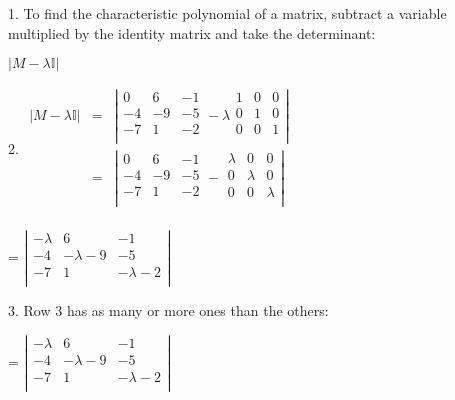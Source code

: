 \documentclass{article}
\begin{document}
1. To find the characteristic polynomial of a matrix, subtract a variable multiplied by the identity matrix and take the determinant:

$| M-\lambda  \mathbb{I}|$

2. $\begin{array}{lll}
| M-\lambda  \mathbb{I}| & = & \left|
      \begin{array}{ccc}
0  & 6  & -1 \\
        -4 & -9 & -5 \\
        -7 & 1  & -2 \\
      \end{array}
      -\lambda
      \begin{array}{ccc}
1 & 0 & 0 \\
        0 & 1 & 0 \\
        0 & 0 & 1 \\
      \end{array}
      \right|                               \\
\text{                        }& = & \left|
      \begin{array}{ccc}
0  & 6  & -1 \\
        -4 & -9 & -5 \\
        -7 & 1  & -2 \\
      \end{array}
      -
      \begin{array}{ccc}
\lambda & 0       & 0       \\
        0       & \lambda & 0       \\
        0       & 0       & \lambda \\
      \end{array}
      \right|                               \\
    \end{array}$

= $\left|
    \begin{array}{ccc}
-\lambda & 6           & -1          \\
      -4       & -\lambda -9 & -5          \\
      -7       & 1           & -\lambda -2 \\
    \end{array}
    \right|$

3. Row $3$ has as many or more ones than the others:

= $\left|
    \begin{array}{ccc}
-\lambda & 6           & -1          \\
      -4       & -\lambda -9 & -5          \\
      -7       & 1           & -\lambda -2 \\
    \end{array}
    \right|$
\end{document}

